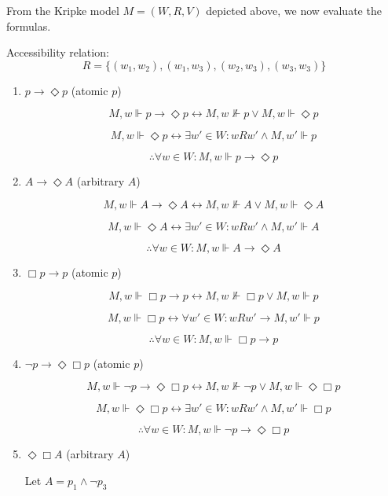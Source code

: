 \documentclass[12pt,a4paper,openany]{article}
\begin{document}
From the Kripke model $M = (W,R,V)$ depicted above, we now evaluate the formulas.

Accessibility relation:
$$R = \{ (w_1, w_2), (w_1, w_3), (w_2, w_3), (w_3, w_3) \}$$

\begin{enumerate}
    \item $p \to \Diamond p$ (atomic $p$)
    
    $$M, w \Vdash p \to \Diamond p \leftrightarrow M, w \nVdash p \vee M, w \Vdash \Diamond p$$
    
    $$M, w \Vdash \Diamond p \leftrightarrow \exists w' \in W: w R w' \wedge M, w' \Vdash p$$
    
    $$\therefore \forall w \in W: M, w \Vdash p \to \Diamond p$$
    
    \item $A \to \Diamond A$ (arbitrary $A$)
    
    $$M, w \Vdash A \to \Diamond A \leftrightarrow M, w \nVdash A \vee M, w \Vdash \Diamond A$$
    
    $$M, w \Vdash \Diamond A \leftrightarrow \exists w' \in W: w R w' \wedge M, w' \Vdash A$$
    
    $$\therefore \forall w \in W: M, w \Vdash A \to \Diamond A$$
    
    \item $\Box p \to p$ (atomic $p$)
    
    $$M, w \Vdash \Box p \to p \leftrightarrow M, w \nVdash \Box p \vee M, w \Vdash p$$
    
    $$M, w \Vdash \Box p \leftrightarrow \forall w' \in W: w R w' \to M, w' \Vdash p$$
    
    $$\therefore \forall w \in W: M, w \Vdash \Box p \to p$$
    
    \item $\neg p \to \Diamond \Box p$ (atomic $p$)
    
    $$M, w \Vdash \neg p \to \Diamond \Box p \leftrightarrow M, w \nVdash \neg p \vee M, w \Vdash \Diamond \Box p$$
    
    $$M, w \Vdash \Diamond \Box p \leftrightarrow \exists w' \in W: w R w' \wedge M, w' \Vdash \Box p$$
    
    $$\therefore \forall w \in W: M, w \Vdash \neg p \to \Diamond \Box p$$
    
    \item $\Diamond \Box A$ (arbitrary $A$)
    
    Let $A = p_1 \wedge \neg p_3$
    

\end{enumerate}
\end{document}
